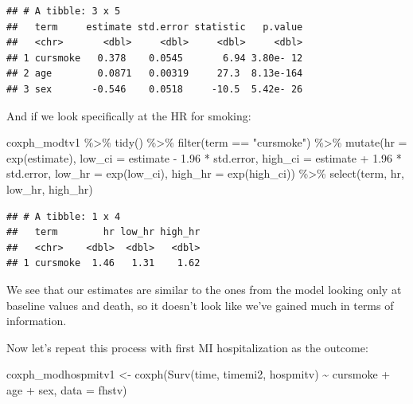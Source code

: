 \documentclass[
]{book}
\newenvironment{Shaded}{\begin{snugshade}}{\end{snugshade}}
\newcommand{\AttributeTok}[1]{\textcolor[rgb]{0.77,0.63,0.00}{#1}}
\newcommand{\FloatTok}[1]{\textcolor[rgb]{0.00,0.00,0.81}{#1}}
\newcommand{\FunctionTok}[1]{\textcolor[rgb]{0.00,0.00,0.00}{#1}}
\newcommand{\NormalTok}[1]{#1}
\newcommand{\OtherTok}[1]{\textcolor[rgb]{0.56,0.35,0.01}{#1}}
\newcommand{\SpecialCharTok}[1]{\textcolor[rgb]{0.00,0.00,0.00}{#1}}
\newcommand{\StringTok}[1]{\textcolor[rgb]{0.31,0.60,0.02}{#1}}
\begin{document}
\begin{verbatim}
## # A tibble: 3 x 5
##   term     estimate std.error statistic   p.value
##   <chr>       <dbl>     <dbl>     <dbl>     <dbl>
## 1 cursmoke   0.378    0.0545       6.94 3.80e- 12
## 2 age        0.0871   0.00319     27.3  8.13e-164
## 3 sex       -0.546    0.0518     -10.5  5.42e- 26
\end{verbatim}

And if we look specifically at the HR for smoking:

\begin{Shaded}
\begin{Highlighting}[]
\NormalTok{coxph\_modtv1 }\SpecialCharTok{\%\textgreater{}\%} 
  \FunctionTok{tidy}\NormalTok{() }\SpecialCharTok{\%\textgreater{}\%} 
  \FunctionTok{filter}\NormalTok{(term }\SpecialCharTok{==} \StringTok{"cursmoke"}\NormalTok{) }\SpecialCharTok{\%\textgreater{}\%} 
  \FunctionTok{mutate}\NormalTok{(}\AttributeTok{hr =} \FunctionTok{exp}\NormalTok{(estimate),}
         \AttributeTok{low\_ci =}\NormalTok{ estimate }\SpecialCharTok{{-}} \FloatTok{1.96} \SpecialCharTok{*}\NormalTok{ std.error, }
         \AttributeTok{high\_ci =}\NormalTok{ estimate }\SpecialCharTok{+} \FloatTok{1.96} \SpecialCharTok{*}\NormalTok{ std.error, }
         \AttributeTok{low\_hr =} \FunctionTok{exp}\NormalTok{(low\_ci), }
         \AttributeTok{high\_hr =} \FunctionTok{exp}\NormalTok{(high\_ci)) }\SpecialCharTok{\%\textgreater{}\%} 
  \FunctionTok{select}\NormalTok{(term, hr, low\_hr, high\_hr)}
\end{Highlighting}
\end{Shaded}

\begin{verbatim}
## # A tibble: 1 x 4
##   term        hr low_hr high_hr
##   <chr>    <dbl>  <dbl>   <dbl>
## 1 cursmoke  1.46   1.31    1.62
\end{verbatim}

We see that our estimates are similar to the ones from the model looking only at baseline values and death, so it doesn't look like we've gained much in terms of information.

Now let's repeat this process with first MI hospitalization as the outcome:

\begin{Shaded}
\begin{Highlighting}[]
\NormalTok{coxph\_modhospmitv1 }\OtherTok{\textless{}{-}} \FunctionTok{coxph}\NormalTok{(}\FunctionTok{Surv}\NormalTok{(time, timemi2, hospmitv) }\SpecialCharTok{\textasciitilde{}} 
\NormalTok{                              cursmoke }\SpecialCharTok{+}\NormalTok{ age }\SpecialCharTok{+}\NormalTok{ sex, }\AttributeTok{data =}\NormalTok{ fhstv)}
\end{Highlighting}
\end{Shaded}
\end{document}
